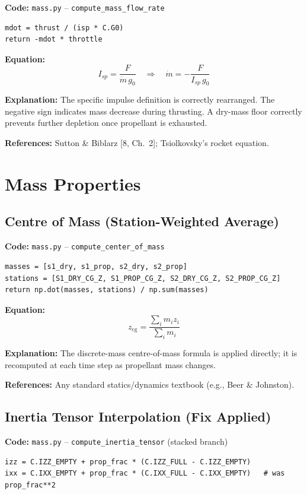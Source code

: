 \documentclass[12pt,a4paper]{article}
\begin{document}
\textbf{Code:} \texttt{mass.py} – \texttt{compute\_mass\_flow\_rate}
\begin{verbatim}
mdot = thrust / (isp * C.G0)
return -mdot * throttle
\end{verbatim}

\textbf{Equation:}
\[
I_{sp} = \frac{F}{\dot{m}\,g_0}\quad\Rightarrow\quad \dot{m} = -\frac{F}{I_{sp}\,g_0}
\]

\textbf{Explanation:} The specific impulse definition is correctly rearranged. The negative sign indicates mass decrease during thrusting. A dry-mass floor correctly prevents further depletion once propellant is exhausted.

\textbf{References:} Sutton \& Biblarz [8, Ch.~2]; Tsiolkovsky's rocket equation.

\section{Mass Properties}

\subsection{Centre of Mass (Station-Weighted Average)}

\textbf{Code:} \texttt{mass.py} – \texttt{compute\_center\_of\_mass}
\begin{verbatim}
masses = [s1_dry, s1_prop, s2_dry, s2_prop]
stations = [S1_DRY_CG_Z, S1_PROP_CG_Z, S2_DRY_CG_Z, S2_PROP_CG_Z]
return np.dot(masses, stations) / np.sum(masses)
\end{verbatim}

\textbf{Equation:}
\[
z_{\text{cg}} = \frac{\sum_i m_i z_i}{\sum_i m_i}
\]

\textbf{Explanation:} The discrete-mass centre-of-mass formula is applied directly; it is recomputed at each time step as propellant mass changes.

\textbf{References:} Any standard statics/dynamics textbook (e.g., Beer \& Johnston).

\subsection{Inertia Tensor Interpolation (Fix Applied)}

\textbf{Code:} \texttt{mass.py} – \texttt{compute\_inertia\_tensor} (stacked branch)
\begin{verbatim}
izz = C.IZZ_EMPTY + prop_frac * (C.IZZ_FULL - C.IZZ_EMPTY)
ixx = C.IXX_EMPTY + prop_frac * (C.IXX_FULL - C.IXX_EMPTY)   # was prop_frac**2
\end{verbatim}
\end{document}
